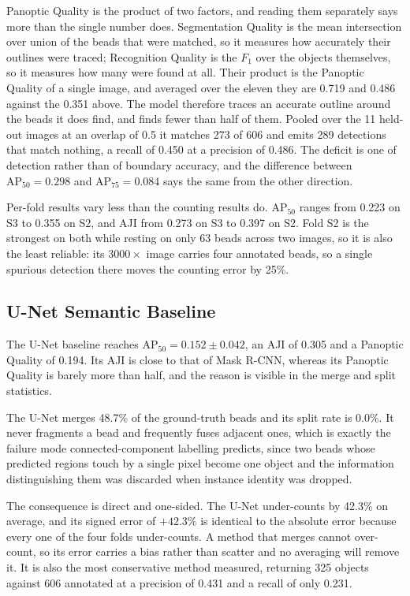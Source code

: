 Panoptic Quality is the product of two factors, and reading them separately says
more than the single number does. Segmentation Quality is the mean intersection
over union of the beads that were matched, so it measures how accurately their
outlines were traced; Recognition Quality is the $F_1$ over the objects
themselves, so it measures how many were found at all. Their product is the
Panoptic Quality of a single image, and averaged over the eleven they are 0.719
and 0.486 against the 0.351 above. The model therefore traces an accurate outline
around the beads it does find, and finds fewer than half of them. Pooled over
the 11 held-out images at an overlap of 0.5 it matches 273 of 606 and emits
289 detections that match nothing, a recall of 0.450 at a precision of 0.486. The
deficit is one of detection rather than of boundary accuracy, and the difference between
$\mathrm{AP}_{50} = 0.298$ and $\mathrm{AP}_{75} = 0.084$ says the same from the
other direction.

Per-fold results vary less than the counting results do. $\mathrm{AP}_{50}$ ranges
from 0.223 on S3 to 0.355 on S2, and AJI from 0.273 on S3 to 0.397 on S2. Fold S2
is the strongest on both while resting on only 63 beads across two images, so
it is also the least reliable: its $3000\times$ image carries four annotated
beads, so a single spurious detection there moves the counting error by 25\%.

\subsection{U-Net Semantic Baseline}

The U-Net baseline reaches $\mathrm{AP}_{50} = 0.152 \pm 0.042$, an AJI of 0.305
and a Panoptic Quality of 0.194. Its AJI is close to that of Mask R-CNN, whereas
its Panoptic Quality is barely more than half, and the reason is visible in the
merge and split statistics.

The U-Net merges 48.7\% of the ground-truth beads and its split rate is 0.0\%. It
never fragments a bead and frequently fuses adjacent ones, which is exactly the
failure mode connected-component labelling predicts, since two beads whose
predicted regions touch by a single pixel become one object and the information
distinguishing them was discarded when instance identity was dropped.

The consequence is direct and one-sided. The U-Net under-counts by 42.3\% on
average, and its signed error of $+42.3\%$ is identical to the absolute error
because every one of the four folds under-counts. A method that merges cannot
over-count, so its error carries a bias rather than scatter and no averaging will
remove it. It is also the most conservative method measured, returning 325 objects
against 606 annotated at a precision of 0.431 and a recall of only 0.231.


